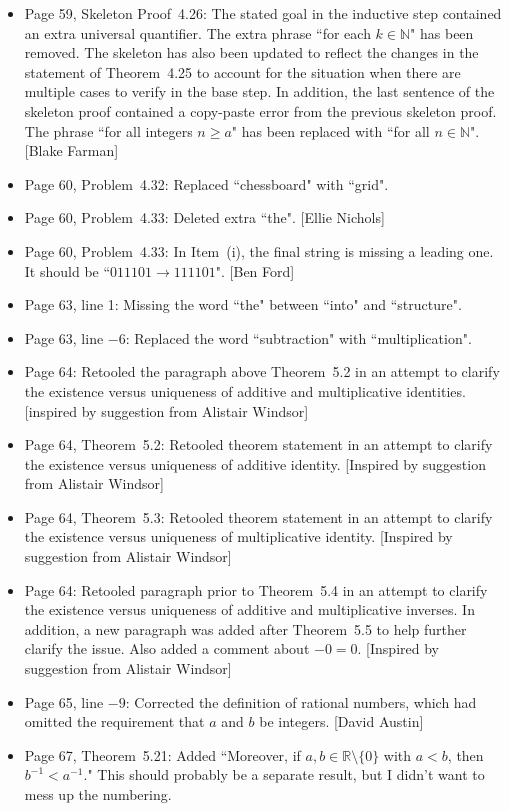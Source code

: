 \documentclass[11pt]{article}%
\begin{document}
\begin{itemize}
\item Page 59, Skeleton Proof~4.26: The stated goal in the inductive step contained an extra universal quantifier.  The extra phrase ``for each $k \in \mathbb{N}$" has been removed.  The skeleton has also been updated to reflect the changes in the statement of Theorem~4.25 to account for the situation when there are multiple cases to verify in the base step. In addition, the last sentence of the skeleton proof contained a copy-paste error from the previous skeleton proof.  The phrase ``for all integers $n \ge a$" has been replaced with ``for all $n\in\mathbb{N}$". [Blake Farman]
\item Page 60, Problem~4.32: Replaced ``chessboard" with ``grid".
\item Page 60, Problem~4.33: Deleted extra ``the". [Ellie Nichols]
\item Page 60, Problem~4.33: In Item~(i), the final string is missing a leading one.  It should be ``$011101 \to 111101$". [Ben Ford]
\item Page 63, line 1: Missing the word ``the" between ``into" and ``structure".
\item Page 63, line $-6$: Replaced the word ``subtraction" with ``multiplication". 
\item Page 64: Retooled the paragraph above Theorem~5.2 in an attempt to clarify the existence versus uniqueness of additive and multiplicative identities. [inspired by suggestion from Alistair Windsor]
\item Page 64, Theorem~5.2: Retooled theorem statement in an attempt to clarify the existence versus uniqueness of additive identity. [Inspired by suggestion from Alistair Windsor]
\item Page 64, Theorem~5.3: Retooled theorem statement in an attempt to clarify the existence versus uniqueness of multiplicative identity. [Inspired by suggestion from Alistair Windsor]
\item Page 64: Retooled paragraph prior to Theorem~5.4 in an attempt to clarify the existence versus uniqueness of additive and multiplicative inverses. In addition, a new paragraph was added after Theorem~5.5 to help further clarify the issue. Also added a comment about $-0=0$. [Inspired by suggestion from Alistair Windsor]
\item Page 65, line $-9$: Corrected the definition of rational numbers, which had omitted the requirement that $a$ and $b$ be integers. [David Austin]
\item Page 67, Theorem~5.21: Added ``Moreover, if $a,b\in \mathbb{R}\setminus\{0\}$ with $a<b$, then $b^{-1}<a^{-1}$." This should probably be a separate result, but I didn't want to mess up the numbering.

\end{itemize}
\end{document}
